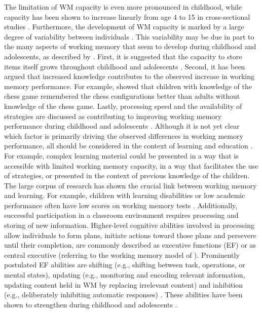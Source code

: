 The limitation of WM capacity is even more pronounced in childhood, while capacity has been shown to increase linearly from age 4 to 15 in cross-sectional studies \parencite{bradyCompressionVisualWorking2009, gathercoleWorkingMemorySkills2004}. Furthermore, the development of WM capacity is marked by a large degree of variability between individuals \parencite{gathercoleDevelopmentMemory1998}. This variability may be due in part to the many aspects of working memory that seem to develop during childhood and adolescents, as described by \textcite{cowanWorkingMemoryUnderpins2014}. First, it is suggested that the capacity to store items itself grows throughout childhood and adolescents \parencite{andrewsCognitiveComplexityMetric2002}. Second, it has been argued that increased knowledge contributes to the observed increase in working memory performance. For example, \textcite{chiKnowledgeStructuresMemory1978} showed that children with knowledge of the chess game remembered the chess configurations better than adults without knowledge of the chess game. Lastly, processing speed \parencite[e.g.,][]{kailProcessingSpeedMental1994} and the availability of strategies are discussed as contributing to improving working memory performance during childhood and adolescents \parencite{cowanWorkingMemoryUnderpins2014}. Although it is not yet clear which factor is primarily driving the observed differences in working memory performance, all should be considered in the context of learning and education \parencite{cowanWorkingMemoryUnderpins2014}. For example, complex learning material could be presented in a way that is accessible with limited working memory capacity, in a way that facilitates the use of strategies, or presented in the context of previous knowledge of the children. 
The large corpus of research has shown the crucial link between working memory and learning. For example, children with learning disabilities or low academic performance often have low scores on working memory tests \parencite{sabolPatternsSchoolReadiness2012, stclair-thompsonExecutiveFunctionsAchievements2006}. Additionally, successful participation in a classroom environment requires processing and storing of new information. Higher-level cognitive abilities involved in processing allow individuals to form plans, initiate actions toward those plans and persevere until their completion, are commonly described as executive functions (EF) or as central executive (referring to the working memory model of \textcite{baddeleyWorkingMemory1974}). Prominently postulated EF abilities are shifting (e.g., shifting between task, operations, or mental states), updating (e.g., monitoring and encoding relevant information, updating content held in WM by replacing irrelevant content) and inhibition (e.g., deliberately inhibiting automatic responses) \parencite{miyakeUnityDiversityExecutive2000}. These abilities have been shown to strengthen during childhood and adolescents \parencite{bestDevelopmentalPerspectiveExecutive2010}.
